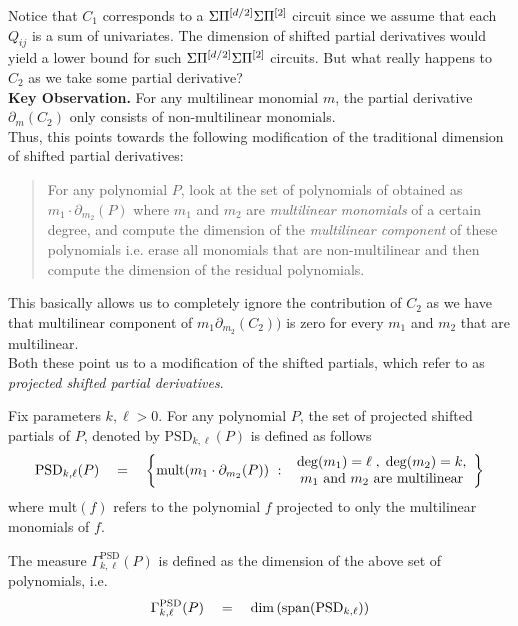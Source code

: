 Notice that $C_1$ corresponds to a $\Sigma\Pi^{[d/2]}\Sigma\Pi^{[2]}$ circuit since we assume that each $Q_{ij}$ is a sum of univariates. 
The dimension of shifted partial derivatives would yield a lower bound for such $\Sigma\Pi^{[d/2]}\Sigma\Pi^{[2]}$ circuits. 
But what really happens to $C_2$ as we take some partial derivative?\\

{\bf Key Observation. } For any multilinear monomial $m$, the partial derivative $\partial_m(C_2)$ only consists of non-multilinear monomials. \\

Thus, this points towards the following modification of the traditional dimension of shifted partial derivatives: 
\begin{quote}
  For any polynomial $P$, look at the set of polynomials of obtained as $m_1 \cdot \partial_{m_2}(P)$ where $m_1$ and $m_2$ are \emph{multilinear monomials} of a certain degree, and compute the dimension of the \emph{multilinear component} of these polynomials i.e. erase all monomials that are non-multilinear and then compute the dimension of the residual polynomials. 
\end{quote}
This basically allows us to completely ignore the contribution of $C_2$ as we have that multilinear component of $m_1 \partial_{m_2}(C_2))$ is zero for every $m_1$ and $m_2$ that are multilinear. \\


Both these point us to a modification of the shifted partials, which \cite{KLSS,KS14} refer to as \emph{projected shifted partial derivatives}. 

\begin{definition}
Fix parameters $k,\ell > 0$. 
For any polynomial $P$, the set of projected shifted partials of $P$, denoted by $\mathrm{PSD}_{k,\ell}(P)$ is defined as follows
\[
\mathrm{PSD}_{k,\ell}(P) \quad = \quad \left\{{\mathrm{mult}(m_1 \cdot \partial_{m_2}(P))}\ : \ {\begin{array}{c}\deg(m_1) = \ell\;,\; \deg(m_2) = k,\\ \text{$m_1$ and $m_2$ are multilinear}\end{array}}\right\}
\]
where $\mathrm{mult}(f)$ refers to the polynomial $f$ projected to only the multilinear monomials of $f$. 

The measure $\Gamma^{\mathrm{PSD}}_{k,\ell}(P)$ is defined as the dimension of the above set of polynomials, i.e.
\[\Gamma^{\mathrm{PSD}}_{k,\ell}(P) \quad = \quad \dim\left(\mathrm{span}(\mathrm{PSD}_{k,\ell})\right)\]
\end{definition}

